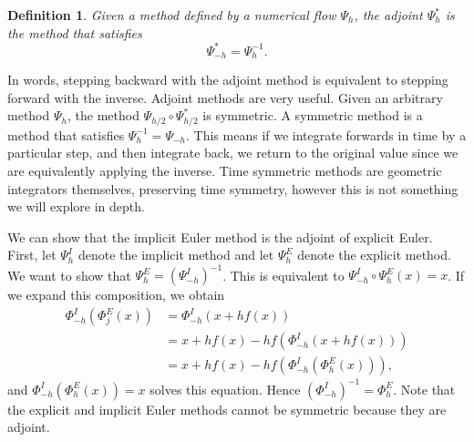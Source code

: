 \documentclass{report}
\theoremstyle{exampstyle} \newtheorem{example}[theorem]{Example}
\theoremstyle{exampstyle} \newtheorem{remark}[theorem]{Remark}
\theoremstyle{exampstyle} \newtheorem{definition}[theorem]{Definition}
\theoremstyle{exampstyle} \newtheorem{lemma}[theorem]{Lemma}
\theoremstyle{exampstyle} \newtheorem{proposition}[theorem]{Proposition}
\begin{document}
\begin{definition}
	Given a method defined by a numerical flow $\Psi_h$,
	the adjoint $\Psi^*_h$ is the method that satisfies
	\begin{equation*}
		\Psi^*_{-h} = \Psi^{-1}_h.
	\end{equation*}
\end{definition}

In words, stepping backward with the adjoint method is equivalent to stepping forward with the inverse.
Adjoint methods are very useful. Given an arbitrary method $\Psi_h$,
the method $\Psi_{h/2} \circ \Psi_{h/2}^*$ is symmetric.
A symmetric method is a method that satisfies $\Psi_h^{-1} = \Psi_{-h}$.
This means if we integrate forwards in time by a particular step, and then integrate back,
we return to the original value since we are equivalently applying the inverse.
Time symmetric methods are geometric integrators themselves, preserving time symmetry,
however this is not something we will explore in depth.

We can show that the implicit Euler method is the adjoint of explicit Euler.
First, let $\Psi_h^I$ denote the implicit method and let $\Psi_h^E$ denote the explicit method.
We want to show that $\Psi_h^E = (\Psi_{-h}^I)^{-1}$.
This is equivalent to $\Psi_{-h}^I \circ \Psi_h^E (x) = x$.
If we expand this composition, we obtain
\begin{align*}
	\Phi_{-h}^I \left( \Phi_j^E  (x) \right) &= \Phi_{-h}^I \left( x + h f(x) \right) \\
	&= x + h f(x) - h f\left( \Phi_{-h}^I \left( x + h f(x) \right) \right) \\
	&= x + h f(x) - h f\left( \Phi_{-h}^I \left( \Phi_h^E (x) \right) \right),
\end{align*}
and $\Phi_{-h}^I (\Phi_h^E (x)) = x$ solves this equation. Hence $(\Phi_{-h}^I)^{-1} = \Phi_h^E$.
Note that the explicit and implicit Euler methods cannot be symmetric because they are adjoint.
\end{document}
